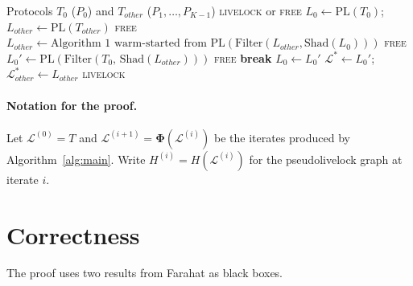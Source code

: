 \documentclass{article}
\newcommand{\Ls}{\mathcal{L}^{*}}
\newcommand{\Li}[1]{\mathcal{L}^{(#1)}}   %
\newcommand{\Hi}[1]{H^{(#1)}}             %
\newcommand{\PL}{\mathrm{PL}}
\newcommand{\Shad}{\mathrm{Shad}}
\newcommand{\Filter}{\mathrm{Filter}}
\newcommand{\bPhi}{\boldsymbol{\Phi}}
\begin{document}
\begin{algorithm}[h]
\caption{Algorithm~2: $(1,1)$-Asymmetric livelock decision}
\label{alg:asym}
\begin{algorithmic}[1]
\Require Protocols $T_0$ ($P_0$) and $T_{\mathit{other}}$ ($P_1,\ldots,P_{K-1}$)
\Ensure \textsc{livelock} or \textsc{free}
\State $L_0 \leftarrow \PL(T_0)$;\quad
       $L_{\mathit{other}} \leftarrow \PL(T_{\mathit{other}})$
  \Return \textsc{free}
\EndIf
{} \hfill{}
  \State {}
  \State $L_{\mathit{other}} \leftarrow
    \text{Algorithm~1 warm-started from }
    \PL(\Filter(L_{\mathit{other}},\Shad(L_0)))$
   \Return \textsc{free} \EndIf
  \State {}
  \State $L_0' \leftarrow \PL(\Filter(T_0,\,\Shad(L_{\mathit{other}})))$
   \Return \textsc{free} \EndIf
   \textbf{break}
    \hfill{}
  \EndIf
  \State $L_0 \leftarrow L_0'$
    \hfill{}
\EndWhile
\State $\Ls \leftarrow L_0'$;\quad $\Ls_{\mathit{other}} \leftarrow L_{\mathit{other}}$
\Return \textsc{livelock}
\end{algorithmic}
\end{algorithm}

\paragraph{Notation for the proof.}
Let $\Li{0}=T$ and $\Li{i+1}=\bPhi(\Li{i})$ be the iterates produced
by Algorithm~\ref{alg:main}. Write $\Hi{i}=H(\Li{i})$ for the
pseudolivelock graph at iterate $i$.

\section{Correctness}
\label{sec:correct}

The proof uses two results from Farahat as black boxes.
\end{document}
